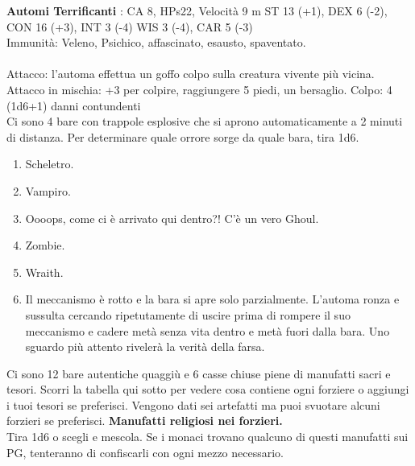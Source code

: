 \documentclass{article}
\begin{document}
    \textbf{Automi Terrificanti} : CA 8, HPs22, Velocità 9 m
    ST 13 (+1), DEX 6 (-2), CON 16 (+3), INT 3 (-4) WIS 3 (-4), CAR 5 (-3)\\
    Immunità: Veleno, Psichico, affascinato, esausto, spaventato.\\
    \\Attacco: l'automa effettua un goffo colpo sulla creatura vivente più vicina. Attacco in mischia: +3 per colpire, raggiungere 5 piedi, un bersaglio. Colpo: 4 (1d6+1) danni contundenti
    \\
    Ci sono 4 bare con trappole esplosive che si aprono automaticamente a 2 minuti di distanza.
    Per determinare quale orrore sorge da quale bara, tira 1d6.
    
\begin{enumerate}
    \item Scheletro.
    \item Vampiro.
    \item Oooops, come ci è arrivato qui dentro?! C’è un vero Ghoul.
    \item Zombie.
    \item Wraith.
    \item Il meccanismo è rotto e la bara si apre solo parzialmente. L'automa ronza e sussulta cercando ripetutamente di uscire prima di rompere il suo meccanismo e cadere metà senza vita dentro e metà fuori dalla bara. Uno sguardo più attento rivelerà la verità della farsa.
\end{enumerate}

Ci sono 12 bare autentiche quaggiù e 6 casse chiuse piene di manufatti sacri e tesori. Scorri la tabella qui sotto per vedere cosa contiene ogni forziere o aggiungi i tuoi tesori se preferisci. Vengono dati sei artefatti ma puoi svuotare alcuni forzieri se preferisci.
\textbf{Manufatti religiosi nei forzieri.}\\
Tira 1d6 o scegli e mescola. Se i monaci trovano qualcuno di questi manufatti sui PG, tenteranno di confiscarli con ogni mezzo necessario.
\end{document}
